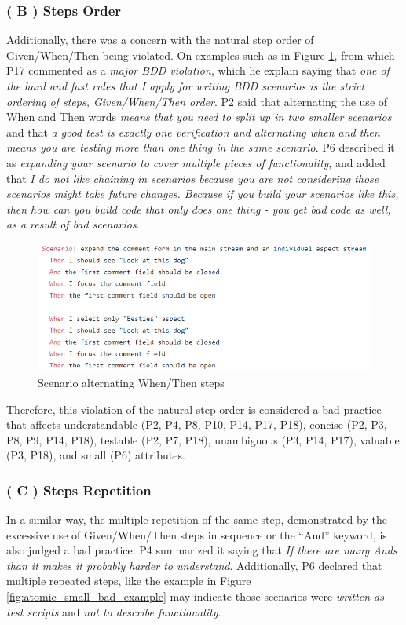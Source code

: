 \subsubsection{\textbf{( B ) Steps Order}}
Additionally, there was a concern with the natural step order of Given/When/Then being violated. On examples such as in Figure \ref{fig:steps_order_alternating_when_then}, from which P17 commented as a \textit{major BDD violation}, which he explain saying that \textit{one of the hard and fast rules that I apply for writing BDD scenarios is the strict ordering of steps, Given/When/Then order}. P2 said that alternating the use of When and Then words \textit{means that you need to split up in two smaller scenarios} and that \textit{a good test is exactly one verification and alternating when and then means you are testing more than one thing in the same scenario}. P6 described it as \textit{expanding your scenario to cover multiple pieces of functionality}, and added that \textit{I do not like chaining in scenarios because you are not considering those scenarios might take future changes. Because if you build your scenarios like this, then how can you build code that only does one thing - you get bad code as well, as a result of bad scenarios}.

\begin{figure}[t]
	\centering
	\includegraphics[scale=0.8]{images/comments_feature_steps_order_P17}
	\caption[\hspace{2mm}Scenario alternating When/Then steps]{Scenario alternating When/Then steps}
	\label{fig:steps_order_alternating_when_then}
\end{figure}

Therefore, this violation of the natural step order is considered a bad practice that affects understandable (P2, P4, P8, P10, P14, P17, P18), concise (P2, P3, P8, P9, P14, P18), testable (P2, P7, P18), unambiguous (P3, P14, P17), valuable (P3, P18), and small (P6) attributes. 

\subsubsection{\textbf{( C ) Steps Repetition}}
In a similar way, the multiple repetition of the same step, demonstrated by the excessive use of Given/When/Then steps in sequence or the ``And'' keyword, is also judged a bad practice. P4 summarized it saying that \textit{If there are many Ands than it makes it probably harder to understand}. Additionally, P6 declared that multiple repeated steps, like the example in Figure \ref{fig:atomic_small_bad_example} may indicate those scenarios were \textit{written as test scripts} and \textit{not to describe functionality}.

